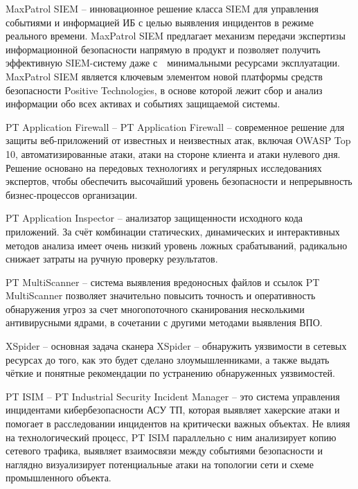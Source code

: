MaxPatrol SIEM -- инновационное решение класса SIEM для управления событиями и информацией ИБ с целью выявления инцидентов в режиме реального времени. MaxPatrol SIEM предлагает механизм передачи экспертизы информационной безопасности напрямую в продукт и позволяет получить эффективную SIEM-систему даже с  минимальными ресурсами эксплуатации. MaxPatrol SIEM является ключевым элементом новой платформы средств безопасности Positive Technologies, в основе которой лежит сбор и анализ информации обо всех активах и событиях защищаемой системы.\par

PT Application Firewall -- PT Application Firewall -- современное решение для защиты веб-приложений от известных и неизвестных атак, включая OWASP Top 10, автоматизированные атаки, атаки на стороне клиента и атаки нулевого дня. Решение основано на передовых технологиях и регулярных исследованиях экспертов, чтобы обеспечить высочайший уровень безопасности и непрерывность бизнес-процессов организации.\par

PT Application Inspector -- анализатор защищенности исходного кода приложений. За счёт комбинации статических, динамических и интерактивных методов анализа имеет очень низкий уровень ложных срабатываний, радикально снижает затраты на ручную проверку результатов.\par

PT MultiScanner -- система выявления вредоносных файлов и ссылок PT MultiScanner позволяет значительно повысить точность и оперативность обнаружения угроз за счет многопоточного сканирования несколькими антивирусными ядрами, в сочетании с другими методами выявления ВПО.\par

XSpider -- основная задача сканера XSpider -- обнаружить уязвимости в сетевых ресурсах до того, как это будет сделано злоумышленниками, а также выдать чёткие и понятные рекомендации по устранению обнаруженных уязвимостей.\par

PT ISIM -- PT Industrial Security Incident Manager -- это система управления инцидентами кибербезопасности АСУ ТП, которая выявляет хакерские атаки и помогает в расследовании инцидентов на критически важных объектах. Не влияя на технологический процесс, PT ISIM параллельно с ним анализирует копию сетевого трафика, выявляет взаимосвязи между событиями безопасности и наглядно визуализирует потенциальные атаки на топологии сети и схеме промышленного объекта.\\
